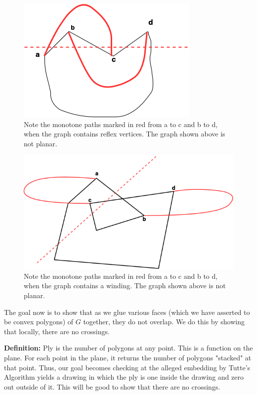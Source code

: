 \documentclass{article}
\begin{document}
    \begin{figure}[H]
    \centering
    \includegraphics[scale=0.5]{Images/monotone_paths_in_reflex_vertices.png}
    \caption{Note the monotone paths marked in red from a to c and b to d, when the graph contains reflex vertices. The graph shown above is not planar.}
    \label{fig:my_label}
    \end{figure}
   
    \begin{figure}[H]
    \centering
    \includegraphics[scale=0.5]{Images/winding_polygon.png}
    \caption{Note the monotone paths marked in red from a to c and b to d, when the graph contains a winding. The graph shown above is not planar.}
    \label{fig:my_label}
    \end{figure}

    \medskip \noindent The goal now is to show that as we glue various faces (which we have asserted to be convex polygons) of $G$ together, they do not overlap. We do this by showing that locally, there are no crossings. 
    
    \medskip \noindent \textbf{Definition:} Ply is the number of polygons at any point. This is a function on the plane. For each point in the plane, it returns the number of polygons "stacked" at that point. 
    \medskip \noindent Thus, our goal becomes checking at the alleged embedding by Tutte's Algorithm yields a drawing in which the ply is one inside the drawing and zero out outside of it. This will be good to show that there are no crossings.
    
\end{document}
